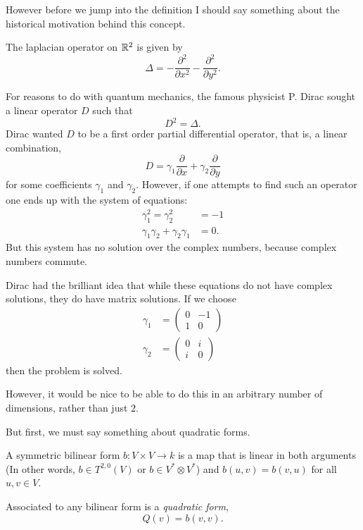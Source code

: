 \documentclass{owmaths}
\begin{document}
However before we jump into the definition
I should say something about the historical motivation behind this concept.

The laplacian operator on $\mathbb{R}^2$ is given by
\begin{equation*}
    \Delta = -\frac{\partial^2}{\partial x^2}-\frac{\partial^2}{\partial y^2}.
\end{equation*}

For reasons to do with quantum mechanics, the famous physicist P. Dirac sought a linear
operator $D$ such that
\begin{equation*}
    D^2 = \Delta.
\end{equation*}
Dirac wanted $D$ to be a first order partial differential operator, that is,
a linear combination,
\begin{equation*}
    D = \gamma_1 \frac{\partial}{\partial x}+\gamma_2 \frac{\partial}{\partial y}
\end{equation*}
for some coefficients $\gamma_1$ and $\gamma_2$. However, if one attempts to find
such an operator one ends up with the system of equations:
\begin{align*}
    \gamma_1^2 = \gamma_2^2 &= -1\\
    \gamma_1\gamma_2+\gamma_2\gamma_1 &= 0.
\end{align*}
But this system has no solution over the complex numbers, because
complex numbers commute. 

Dirac had the brilliant idea that while these equations do not have complex solutions,
they do have matrix solutions.
If we choose
\begin{align*}
    \gamma_1 &= \begin{pmatrix} 0 & -1 \\ 1 & 0 \end{pmatrix}\\
    \gamma_2 &= \begin{pmatrix} 0 & i \\ i & 0 \end{pmatrix}
\end{align*}
then the problem is solved. 

However, it would be nice to be able to do this in an arbitrary number
of dimensions, rather than just $2$.

But first,
we must say something about quadratic forms.
\begin{definition}
    A symmetric bilinear form $b:V\times V\rightarrow k$
    is a map that is linear in both arguments (In other words, $b \in T^{2,0}(V)$
    or $b \in V^* \otimes V^*$) and $b(u,v) = b(v,u)$ for all $u,v \in V$. 
    
    Associated to any bilinear form is a \emph{quadratic form},
    \begin{equation*}
        Q(v) = b(v,v).
    \end{equation*}
\end{definition}
\end{document}
